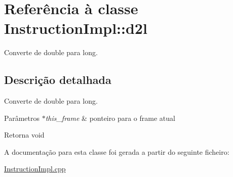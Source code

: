 \hypertarget{class_instruction_impl_1_1d2l}{}\section{Referência à classe Instruction\+Impl\+:\+:d2l}
\label{class_instruction_impl_1_1d2l}


Converte de double para long.  




\subsection{Descrição detalhada}
Converte de double para long. 


\begin{DoxyParams}{Parâmetros}
{\em $\ast$this\+\_\+frame} & ponteiro para o frame atual \\
\hline
\end{DoxyParams}
\begin{DoxyReturn}{Retorna}
void 
\end{DoxyReturn}


A documentação para esta classe foi gerada a partir do seguinte ficheiro\+:\begin{DoxyCompactItemize}
\item 
\hyperlink{_instruction_impl_8cpp}{Instruction\+Impl.\+cpp}\end{DoxyCompactItemize}
